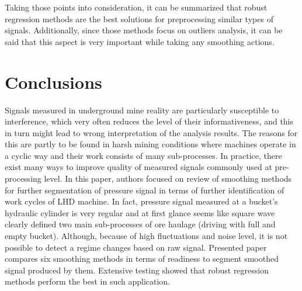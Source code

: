 \documentclass{webofc}
\begin{document}
Taking those points into consideration, it can be summarized that robust regression methods are the best solutions for preprocessing similar types of signals. Additionally, since those methods focus on outliers analysis, it can be said that this aspect is very important while taking any smoothing actions.

\section{Conclusions}

Signals measured in underground mine reality are particularly susceptible to interference, which very often reduces the level of their informativeness, and this in turn might lead to wrong interpretation of the analysis results. The reasons for this are partly to be found in harsh mining conditions where machines operate in a cyclic way and their work consists of many sub-processes. In practice, there exist many ways to improve quality of measured signals commonly used at pre-processing level. In this paper, authors focused on review of smoothing methods for further segmentation of pressure signal in terms of further identification of work cycles of LHD machine. In fact, pressure signal measured at a bucket's hydraulic cylinder is very regular and at first glance seems like square wave clearly defined two main sub-processes of ore haulage (driving with full and empty bucket). Although, because of high fluctuations and noise level, it is not possible to detect a regime changes based on raw signal. Presented paper compares six smoothing methods in terms of readiness to segment smoothed signal produced by them. Extensive testing showed that robust regression methods perform the best in such application.

%
% 
%
%
% 

\end{document}
